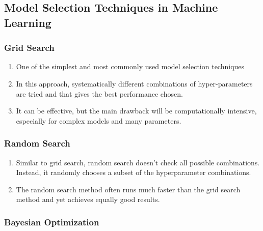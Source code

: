 \subsection{Model Selection Techniques in Machine Learning}

\subsubsection{Grid Search}

\begin{enumerate}
    \item One of the simplest and most commonly used model selection techniques
    \hfill \cite{geeksforgeeks/machine-learning/model-selection-for-machine-learning}

    \item In this approach, systematically different combinations of hyper-parameters are tried and that gives the best performance chosen.
    \hfill \cite{geeksforgeeks/machine-learning/model-selection-for-machine-learning}

    \item It can be effective, but the main drawback will be computationally intensive, especially for complex models and many parameters.
    \hfill \cite{geeksforgeeks/machine-learning/model-selection-for-machine-learning}
\end{enumerate}



\subsubsection{Random Search}

\begin{enumerate}
    \item Similar to grid search, random search doesn't check all possible combinations. Instead, it randomly chooses a subset of the hyperparameter combinations.
    \hfill \cite{geeksforgeeks/machine-learning/model-selection-for-machine-learning}

    \item The random search method often runs much faster than the grid search method and yet achieves equally good results.
    \hfill \cite{geeksforgeeks/machine-learning/model-selection-for-machine-learning}
\end{enumerate}



\subsubsection{Bayesian Optimization}

